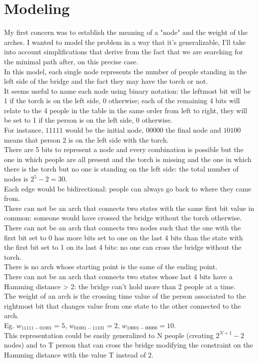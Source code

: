 \documentclass[1pt]{article}
\begin{document}
	\section{Modeling}
		My first concern was to establish the meaning of a "node" and the weight of the arches. I wanted to model the problem in a way that it's generalizable, I'll take into account simplifications that derive from the fact that we are searching for the minimal path after, on this precise case.\\
		In this model, each single node represents the number of people standing in the left side of the bridge and the fact they may have the torch or not.\\ It seems useful to name each node using binary notation: the leftmost bit will be 1 if the torch is on the left side, 0 otherwise; each of the remaining 4 bits will relate to the 4 people in the table in the same order from left to right, they will be set to 1 if the person is on the left side, 0 otherwise. \\For instance, $11111$ would be the initial node, $00000$ the final node and $10100$ means that person 2 is on the left side with the torch. \\ 
		There are 5 bits to represent a node and every combination is possible but the one in which people are all present and the torch is missing and the one in which there is the torch but no one is standing on the left side: the total number of nodes is $2^5 - 2 = 30$. \\
		Each edge would be bidirectional: people can always go back to where they came from. \\
		There can not be an arch that connects two states with the same first bit value in common: someone would have crossed the bridge without the torch otherwise.\\
		There can not be an arch that connects two nodes such that the one with the first bit set to 0 has more bits set to one on the last 4 bits than the state with the first bit set to 1 on its last 4 bits: no one can cross the bridge without the torch.
		\\
		There is no arch whose starting point is the same of the ending point. 
		\\
		There can not be an arch that connects two states whose last 4 bits have a Hamming distance > 2: the bridge can't hold more than 2 people at a time.
		\\
		The weight of an arch is the crossing time value of the person associated to the rightmost bit that changes value from one state to the other connected to the arch. \\Eg. $w_{11111-01001} = 5$, $w_{01001-11101} = 2$, $w_{10001-00000} = 10$. \\
		This representation could be easily generalized to N people (creating $2^{N+1} - 2$ nodes) and to T person that can cross the bridge modifying the constraint on the Hamming distance with the value T instead of 2.
\end{document}
